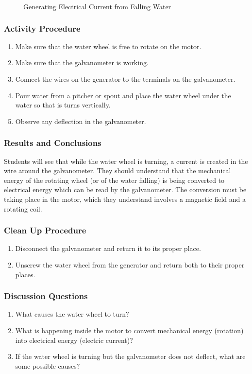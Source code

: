 \begin{figure}[h]
\begin{center}
\def\svgwidth{200pt}

\caption{Generating Electrical Current from Falling Water}
\label{fig:water-turbine}
\end{center}
\end{figure}

\subsubsection*{Activity Procedure}
\begin{enumerate}
\item{Make sure that the water wheel is free to rotate on the motor.} 
\item{Make sure that the galvanometer is working.} 
\item{Connect the wires on the generator to the terminals on the galvanometer.} 
\item{Pour water from a pitcher or spout and place the water wheel under the water so that is turns vertically.} 
\item{Observe any deflection in the galvanometer.} 
\end{enumerate}

\subsubsection*{Results and Conclusions}
Students will see that while the water wheel is turning, a current is created in the wire around the galvanometer. They should understand that the mechanical energy of the rotating wheel (or of the water falling) is being converted to electrical energy which can be read by the galvanometer. The conversion must be taking place in the motor, which they understand involves a magnetic field and a rotating coil.  

\subsubsection*{Clean Up Procedure}
\begin{enumerate}
\item{Disconnect the galvanometer and return it to its proper place.} 
\item{Unscrew the water wheel from the generator and return both to their proper places.} 
\end{enumerate}

\subsubsection*{Discussion Questions}
\begin{enumerate}
\item{What causes the water wheel to turn?}
\item{What is happening inside the motor to convert mechanical energy (rotation) into electrical energy (electric current)?}
\item{If the water wheel is turning but the galvanometer does not deflect, what are some possible causes?}
\end{enumerate}

